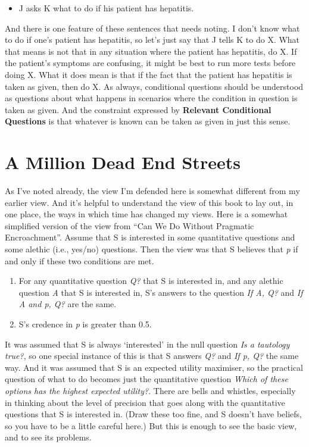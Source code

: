 \documentclass[
  11pt,
]{book}
\providecommand{\tightlist}{%
  \setlength{\itemsep}{0pt}\setlength{\parskip}{0pt}}
\begin{document}
\begin{itemize}
\tightlist
\item
  J asks K what to do if his patient has hepatitis.
\end{itemize}

And there is one feature of these sentences that needs noting. I don't know what to do if one's patient has hepatitis, so let's just say that J tells K to do X. What that means is not that in any situation where the patient has hepatitis, do X. If the patient's symptoms are confusing, it might be best to run more tests before doing X. What it does mean is that if the fact that the patient has hepatitis is taken as given, then do X. As always, conditional questions should be understood as questions about what happens in scenarios where the condition in question is taken as given. And the constraint expressed by \textbf{Relevant Conditional Questions} is that whatever is known can be taken as given in just this sense.

\hypertarget{mychanges}{%
\section{A Million Dead End Streets}\label{mychanges}}

As I've noted already, the view I'm defended here is somewhat different from my earlier view. And it's helpful to understand the view of this book to lay out, in one place, the ways in which time has changed my views. Here is a somewhat simplified version of the view from ``Can We Do Without Pragmatic Encroachment''. Assume that S is interested in some quantitative questions and some alethic (i.e., yes/no) questions. Then the view was that S believes that \emph{p} if and only if these two conditions are met.

\begin{enumerate}
\def\labelenumi{\arabic{enumi}.}
\tightlist
\item
  For any quantitative question \emph{Q?} that S is interested in, and any alethic question \emph{A} that S is interested in, S's answers to the question \emph{If A, Q?} and \emph{If A and p, Q?} are the same.
\item
  S's credence in \emph{p} is greater than 0.5.
\end{enumerate}

It was assumed that S is always `interested' in the null question \emph{Is a tautology true?}, so one special instance of this is that S answers \emph{Q?} and \emph{If p, Q?} the same way. And it was assumed that S is an expected utility maximiser, so the practical question of what to do becomes just the quantitative question \emph{Which of these options has the highest expected utility?}. There are bells and whistles, especially in thinking about the level of precision that goes along with the quantitative questions that S is interested in. (Draw these too fine, and S doesn't have beliefs, so you have to be a little careful here.) But this is enough to see the basic view, and to see its problems.
\end{document}
